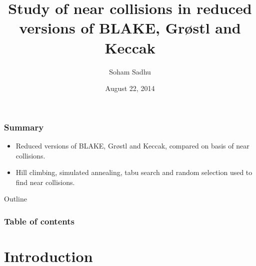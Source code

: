 \documentclass{beamer}
\begin{document}
\title{Study of near collisions in reduced versions of BLAKE, Gr{\o}stl and Keccak}  
\author{Soham Sadhu}
\date{August 22, 2014} 

\begin{frame}
\titlepage
\end{frame}


\begin{frame}
  \frametitle{Summary}
  \begin{itemize}
    \item Reduced versions of BLAKE, Gr{\o}stl and Keccak, compared on basis of near collisions.
    \item Hill climbing, simulated annealing, tabu search and random selection used to find near 
      collisions.
  \end{itemize}
\end{frame}

\begin{frame}[allowframebreaks]{Outline}
\frametitle{Table of contents}
\tableofcontents
\end{frame} 

\section{Introduction}
\end{document}
